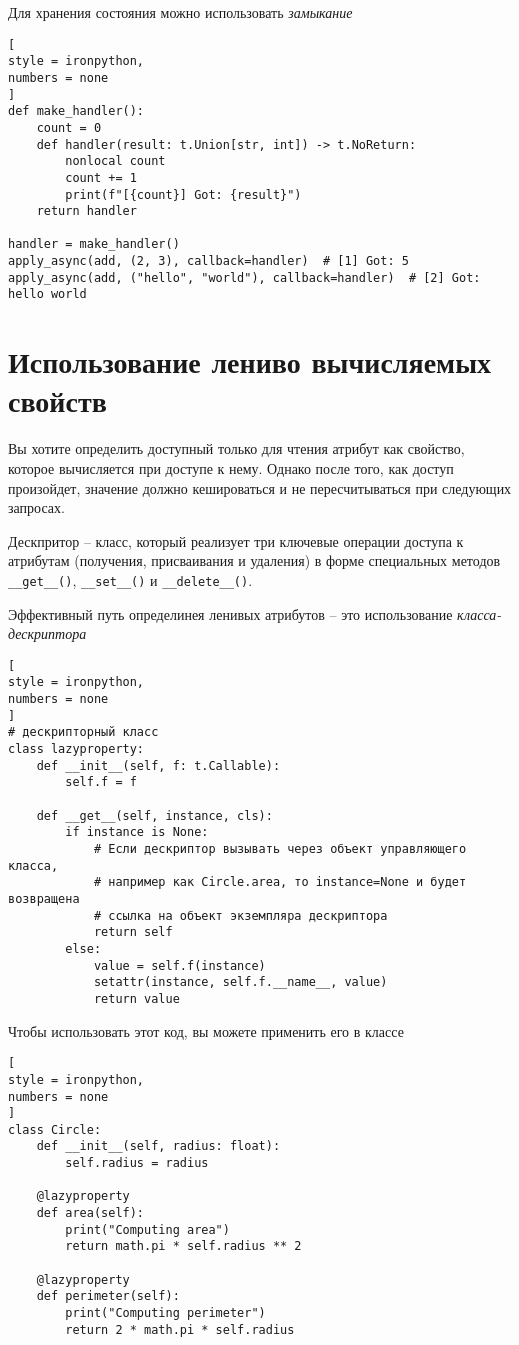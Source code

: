 \documentclass[%
	11pt,
	a4paper,
	utf8,
		]{article}
\begin{document}
Для хранения состояния можно использовать \emph{замыкание} \cite[]{beazley:python_cookbook-2019}
\begin{lstlisting}[
style = ironpython,
numbers = none
]
def make_handler():
    count = 0
    def handler(result: t.Union[str, int]) -> t.NoReturn:
        nonlocal count
        count += 1
        print(f"[{count}] Got: {result}")
    return handler
    
handler = make_handler()
apply_async(add, (2, 3), callback=handler)  # [1] Got: 5
apply_async(add, ("hello", "world"), callback=handler)  # [2] Got: hello world 
\end{lstlisting}

\section{Использование лениво вычисляемых свойств}

Вы хотите определить доступный только для чтения атрибут как свойство, которое вычисляется при доступе к нему. Однако после того, как доступ произойдет, значение должно кешироваться и не пересчитываться при следующих запросах.

Дескпритор -- класс, который реализует три ключевые операции доступа к атрибутам (получения, присваивания и удаления) в форме специальных методов \verb|__get__()|, \verb|__set__()| и \verb|__delete__()|.

Эффективный путь определинея ленивых атрибутов -- это использование \emph{класса-дескриптора} \cite[]{beazley:python_cookbook-2019}
\begin{lstlisting}[
style = ironpython,
numbers = none
]
# дескрипторный класс
class lazyproperty:
    def __init__(self, f: t.Callable):
        self.f = f
        
    def __get__(self, instance, cls):
        if instance is None:
            # Если дескриптор вызывать через объект управляющего класса,
            # например как Circle.area, то instance=None и будет возвращена
            # ссылка на объект экземпляра дескриптора
            return self  
        else:
            value = self.f(instance)
            setattr(instance, self.f.__name__, value)
            return value
\end{lstlisting}

Чтобы использовать этот код, вы можете применить его в классе
\begin{lstlisting}[
style = ironpython,
numbers = none
]
class Circle:
    def __init__(self, radius: float):
        self.radius = radius
        
    @lazyproperty
    def area(self):
        print("Computing area")
        return math.pi * self.radius ** 2
    
    @lazyproperty
    def perimeter(self):
        print("Computing perimeter")
        return 2 * math.pi * self.radius
\end{lstlisting}
\end{document}

